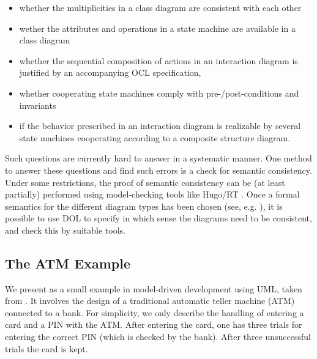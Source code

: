 \documentclass[10pt,fleqn,%
\ifpretendfinal
final%
\else
draft%
\fi,
]{scrreprt}
\newcommand{\ssclause}[1]{\subsection{#1}}
\begin{document}
\begin{itemize}
\item whether the multiplicities in a class diagram are consistent with each other
\item wether the attributes and operations in a state machine are
available in a class diagram
\item	  whether the sequential composition of actions in an interaction diagram is justified by an accompanying OCL specification,
\item 	whether cooperating state machines comply with pre-/post-conditions and invariants
\item 	if the behavior prescribed in an interaction diagram is realizable by several state machines cooperating according to a composite structure diagram.
\end{itemize}
Such questions are currently hard to answer in a systematic manner. One method to answer these questions and find such errors is a check for semantic 
consistency. Under some restrictions, the proof of semantic consistency can be (at least partially) performed using model-checking tools like Hugo/RT \cite{knapp-wuttke:models06wsh:2007}. 
Once a formal semantics for the different diagram types has been chosen (see, e.g. \cite{knapp-mossakowski-roggenbach:corr:2014}), it is possible to use DOL to specify in which 
sense the diagrams need to be consistent, and check this by suitable tools.


\ssclause{The ATM Example}
\label{sec:atm-example}

We present as a small example in model-driven development using UML,
taken from \cite{knapp-mossakowski-roggenbach:corr:2014}.  It involves
the design of a traditional automatic teller machine (ATM) connected
to a bank. For simplicity, we only describe the handling of entering a
card and a PIN with the ATM. After entering the card, one has three
trials for entering the correct PIN (which is checked by the
bank). After three unsuccessful trials the card is kept.
\end{document}
